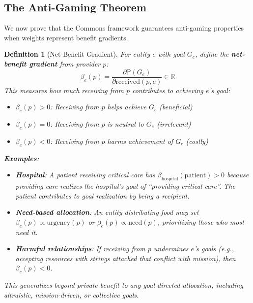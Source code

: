\documentclass[11pt]{article}
\newtheorem{definition}{Definition}
\begin{document}
\subsection{The Anti-Gaming Theorem}

We now prove that the Commons framework guarantees anti-gaming properties when weights represent benefit gradients.

\begin{definition}[Net-Benefit Gradient]
For entity $e$ with goal $G_e$, define the \textbf{net-benefit gradient} from provider $p$:
\[
\beta_e(p) = \frac{\partial \mathbb{P}(G_e)}{\partial \text{received}(p, e)} \in \mathbb{R}
\]
This measures how much receiving from $p$ contributes to achieving $e$'s goal:
\begin{itemize}
\item $\beta_e(p) > 0$: Receiving from $p$ helps achieve $G_e$ (beneficial)
\item $\beta_e(p) = 0$: Receiving from $p$ is neutral to $G_e$ (irrelevant)
\item $\beta_e(p) < 0$: Receiving from $p$ harms achievement of $G_e$ (costly)
\end{itemize}

\textbf{Examples}:
\begin{itemize}
\item \textbf{Hospital}: A patient receiving critical care has $\beta_{\text{hospital}}(\text{patient}) > 0$ because providing care realizes the hospital's goal of ``providing critical care''. The patient contributes to goal realization by being a recipient.
\item \textbf{Need-based allocation}: An entity distributing food may set $\beta_e(p) \propto \text{urgency}(p)$ or $\beta_e(p) \propto \text{need}(p)$, prioritizing those who most need it.
\item \textbf{Harmful relationships}: If receiving from $p$ undermines $e$'s goals (e.g., accepting resources with strings attached that conflict with mission), then $\beta_e(p) < 0$.
\end{itemize}

This generalizes beyond private benefit to \emph{any} goal-directed allocation, including altruistic, mission-driven, or collective goals.
\end{definition}
\end{document}
